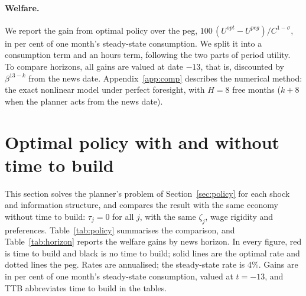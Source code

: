 \documentclass[11pt]{article}
\theoremstyle{definition}
\begin{document}
\paragraph{Welfare.} We report the gain from optimal policy over the peg,
$100\,(U^{opt}-U^{peg})/C^{1-\sigma}$, in per cent of one month's steady-state consumption. We split
it into a consumption term and an hours term, following the two parts of period utility. To compare
horizons, all gains are valued at date $-13$, that is, discounted by $\beta^{13-k}$ from the news
date. Appendix~\ref{app:comp} describes the numerical method: the exact nonlinear model under perfect foresight,
with $H=8$ free months ($k+8$ when the planner acts from the news date).

\section{Optimal policy with and without time to build}\label{sec:results}

This section solves the planner's problem of Section~\ref{sec:policy} for each shock and information
structure, and compares the result with the same economy without time to build: $\tau_j=0$ for all
$j$, with the same $\zeta_j$, wage rigidity and preferences. Table~\ref{tab:policy} summarises
the comparison, and Table~\ref{tab:horizon} reports the welfare gains by news horizon. In every
figure, red is time to build and black is no time to build; solid lines are the optimal rate and
dotted lines the peg. Rates are annualised; the steady-state rate is 4\%. Gains are in per cent of
one month's steady-state consumption, valued at $t=-13$, and TTB abbreviates time to build in the
tables.
\end{document}
